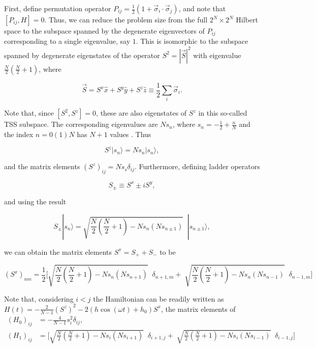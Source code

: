\documentclass{article}
\begin{document}
First, define permutation operator $P_{ij} = \displaystyle\frac{1}{2}\left(1+ \vec{\sigma}_i\cdot\vec{\sigma}_j\right)$,
and note that $[P_{ij}, H]=0$. Thus, we can reduce the problem size from the full $2^N\times 2^N$ Hilbert space
to the subspace spanned by the degenerate eigenvectors of $P_{ij}$ corresponding to a single eigenvalue, say $1$.
This is isomorphic to the subspace spanned by degenerate eigenstates of the operator $S^2=|\vec{S}|^2$ with eigenvalue
$\displaystyle\frac{N}{2}\left(\frac{N}{2}+1\right)$, where

\begin{equation}
\vec{S}=S^x\hat{x}+S^y\hat{y}+S^z\hat{z}\equiv\frac12 \sum_i \vec{\sigma}_i.
\end{equation}

Note that, since $[S^2, S^z]=0$, these are also eigenstates of $S^z$ in this so-called
TSS subspace. The corresponding eigenvalues are $Ns_n$, where $s_n=-\frac{1}{2}+\frac{n}{N}$ and the index
$n= 0 (1) N$ has $N+1$ values \cite{Mori}. Thus

\begin{equation}
S^z |s_n\rangle = Ns_n|s_n\rangle,
\end{equation}

and the matrix elements $(S^z)_{ij} = Ns_s\delta_{ij}$. Furthermore, defining ladder operators

\begin{equation}
S_\pm \equiv S^x \pm i S^y,
\end{equation}

and using the result

\begin{equation}
S_\pm |s_n\rangle = \sqrt{\frac{N}{2}\left(\frac{N}{2}+1\right) - Ns_n\left(Ns_{n\pm 1}\right)}\;\;|s_{n\pm 1}\rangle,
\end{equation}

we can obtain the matrix elements $S^x = S_+ + S_-$ to be

\begin{equation*}
(S^x)_{nm} = \frac{1}{2}\bigg[\sqrt{\frac{N}{2}\left(\frac{N}{2}+1\right) - Ns_n\left(Ns_{n + 1}\right)}\;\;\delta_{n+1, m}  
                        +\;\sqrt{\frac{N}{2}\left(\frac{N}{2}+1\right) - Ns_n\left(Ns_{n- 1}\right)}\;\;\delta_{n-1,m}\bigg]
\end{equation*}

Note that, considering $i<j$ the Hamiltonian can be readily written as
$H(t) = -\displaystyle\frac{2}{N-1}(S^z)^2 - 2(h \cos{(\omega t )} + h_0)S^x$, the matrix elements of
\begin{align*}
\left(H_0\right)_{ij} &= -\frac{4}{N-1} s^2_i \delta_{ij},\nonumber\\
\left(H_1\right)_{ij} &= \bigg[\sqrt{\frac{N}{2}\left(\frac{N}{2}+1\right) - Ns_i\left(Ns_{i + 1}\right)}\;\;\delta_{i+1, j}  
                        +\;\sqrt{\frac{N}{2}\left(\frac{N}{2}+1\right) - Ns_i\left(Ns_{i- 1}\right)}\;\;\delta_{i-1,j}\bigg]
\end{align*}
\end{document}
